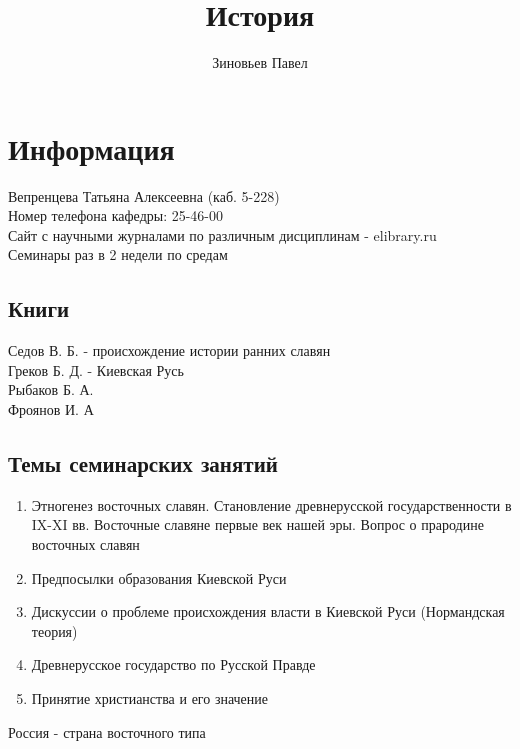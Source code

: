 \documentclass[a4paper, 11pt, oneside]{article}
\title{История}
\author{Зиновьев Павел}
\begin{document}
\maketitle
\newpage
\tableofcontents
\contentsname
\newpage

\section{Информация}
Вепренцева Татьяна Алексеевна (каб. 5-228)\\
Номер телефона кафедры: 25-46-00\\
Сайт с научными журналами по различным дисциплинам - elibrary.ru\\
Семинары раз в 2 недели по средам
\subsection{Книги}
Седов В. Б. - происхождение истории ранних славян\\
Греков Б. Д. - Киевская Русь\\
Рыбаков Б. А.\\
Фроянов И. А


\subsection{Темы семинарских занятий}

\begin{enumerate}
\item Этногенез восточных славян. Становление древнерусской государственности в IX-XI вв. Восточные славяне первые век нашей эры. Вопрос о прародине восточных славян
\item Предпосылки образования Киевской Руси
\item Дискуссии о проблеме происхождения власти в Киевской Руси (Нормандская теория)
\item Древнерусское государство по Русской Правде
\item Принятие христианства и его значение
\end{enumerate}

Россия - страна восточного типа
\end{document}
